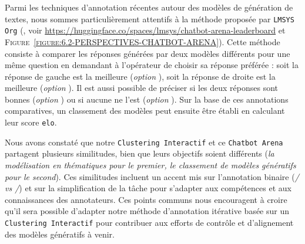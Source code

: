 		\begin{leftBarAuthorOpinion}
			Parmi les techniques d'annotation récentes autour des modèles de génération de textes, nous sommes particulièrement attentifs à la méthode  proposée par \texttt{LMSYS Org} (\cite{chiang-etal:2024:chatbot-arena-open}, voir \url{https://huggingface.co/spaces/lmsys/chatbot-arena-leaderboard} et \textsc{Figure~\ref{figure:6.2-PERSPECTIVES-CHATBOT-ARENA}}).
			Cette méthode consiste à comparer les réponses générées par deux modèles différents pour une même question en demandant à l'opérateur de choisir sa réponse préférée : soit la réponse de gauche est la meilleure (\textit{option }), soit la réponse de droite est la meilleure (\textit{option }).
			Il est aussi possible de préciser si les deux réponses sont bonnes (\textit{option }) ou si aucune ne l'est (\textit{option }).
			Sur la base de ces annotations comparatives, un classement des modèles peut ensuite être établi en calculant leur score \texttt{elo}.
			
			Nous avons constaté que notre \texttt{Clustering Interactif} et ce \texttt{Chatbot Arena} partagent plusieurs similitudes, bien que leurs objectifs soient différents (\textit{la modélisation en thématiques pour le premier, le classement de modèles génératifs pour le second}).
			Ces similitudes incluent un accent mis sur l'annotation binaire (\textit{{\faEquals}/{\faNotEqual} vs {\faHandPointLeft}/{\faHandPointRight}}) et sur la simplification de la tâche pour s'adapter aux compétences et aux connaissances des annotateurs.
			Ces points communs nous encouragent à croire qu'il sera possible d'adapter notre méthode d'annotation itérative basée sur un \texttt{Clustering Interactif} pour contribuer aux efforts de contrôle et d'alignement des modèles génératifs à venir.
		

\end{leftBarAuthorOpinion}
